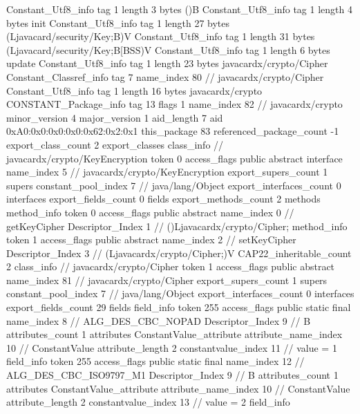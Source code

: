 {{{		}
		Constant_Utf8_info {
			tag	1
			length	3
			bytes	()B
		}
		Constant_Utf8_info {
			tag	1
			length	4
			bytes	init
		}
		Constant_Utf8_info {
			tag	1
			length	27
			bytes	(Ljavacard/security/Key;B)V
		}
		Constant_Utf8_info {
			tag	1
			length	31
			bytes	(Ljavacard/security/Key;B[BSS)V
		}
		Constant_Utf8_info {
			tag	1
			length	6
			bytes	update
		}
		Constant_Utf8_info {
			tag	1
			length	23
			bytes	javacardx/crypto/Cipher
		}
		Constant_Classref_info {
			tag	7
			name_index	80		// javacardx/crypto/Cipher
		}
		Constant_Utf8_info {
			tag	1
			length	16
			bytes	javacardx/crypto
		}
		CONSTANT_Package_info {
			tag	13
			flags	1
			name_index	82		// javacardx/crypto
			minor_version	4
			major_version	1
			aid_length	7
			aid	0xA0:0x0:0x0:0x0:0x62:0x2:0x1
		}
	}
	this_package	83
	referenced_package_count	-1
	export_class_count	2
	export_classes {
		class_info {		// javacardx/crypto/KeyEncryption
			token	0
			access_flags	public abstract interface
			name_index	5		// javacardx/crypto/KeyEncryption
			export_supers_count	1
			supers {
				constant_pool_index	7		// java/lang/Object
			}
			export_interfaces_count	0
			interfaces {
			}
			export_fields_count	0
			fields {
			}
			export_methods_count	2
			methods {
				method_info {
					token	0
					access_flags	public abstract
					name_index	0		// getKeyCipher
					Descriptor_Index	1		// ()Ljavacardx/crypto/Cipher;
				}
				method_info {
					token	1
					access_flags	public abstract
					name_index	2		// setKeyCipher
					Descriptor_Index	3		// (Ljavacardx/crypto/Cipher;)V
				}
			}
			CAP22_inheritable_count	2
		}
		class_info {		// javacardx/crypto/Cipher
			token	1
			access_flags	public abstract
			name_index	81		// javacardx/crypto/Cipher
			export_supers_count	1
			supers {
				constant_pool_index	7		// java/lang/Object
			}
			export_interfaces_count	0
			interfaces {
			}
			export_fields_count	29
			fields {
			field_info {
				token	255
				access_flags	public static final
				name_index	8		// ALG_DES_CBC_NOPAD
				Descriptor_Index	9		// B
				attributes_count	1
				attributes {
				ConstantValue_attribute {
					attribute_name_index	10		// ConstantValue
					attribute_length	2
					constantvalue_index	11		// value = 1
				}
				}
			}
			field_info {
				token	255
				access_flags	public static final
				name_index	12		// ALG_DES_CBC_ISO9797_M1
				Descriptor_Index	9		// B
				attributes_count	1
				attributes {
				ConstantValue_attribute {
					attribute_name_index	10		// ConstantValue
					attribute_length	2
					constantvalue_index	13		// value = 2
				}
				}
			}
			field_info {
}}}}}
